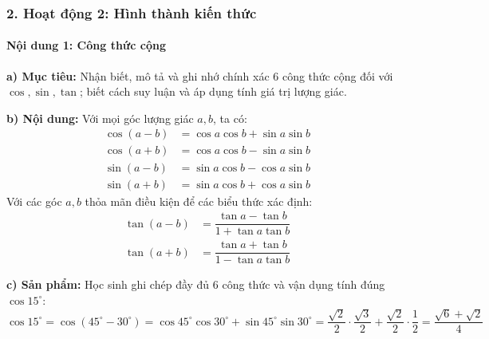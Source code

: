 \documentclass[12pt, a4paper]{article}
\begin{document}
\subsubsection*{2. Hoạt động 2: Hình thành kiến thức}

\paragraph{Nội dung 1: Công thức cộng}
\textbf{a) Mục tiêu:} Nhận biết, mô tả và ghi nhớ chính xác 6 công thức cộng đối với $\cos, \sin, \tan$; biết cách suy luận và áp dụng tính giá trị lượng giác.

\textbf{b) Nội dung:}
Với mọi góc lượng giác $a, b$, ta có:
\begin{align*}
    \cos(a - b) &= \cos a \cos b + \sin a \sin b \\
    \cos(a + b) &= \cos a \cos b - \sin a \sin b \\
    \sin(a - b) &= \sin a \cos b - \cos a \sin b \\
    \sin(a + b) &= \sin a \cos b + \cos a \sin b
\end{align*}
Với các góc $a, b$ thỏa mãn điều kiện để các biểu thức xác định:
\begin{align*}
    \tan(a - b) &= \dfrac{\tan a - \tan b}{1 + \tan a \tan b} \\
    \tan(a + b) &= \dfrac{\tan a + \tan b}{1 - \tan a \tan b}
\end{align*}

\textbf{c) Sản phẩm:} Học sinh ghi chép đầy đủ 6 công thức và vận dụng tính đúng $\cos 15^\circ$:
$$\cos 15^\circ = \cos(45^\circ - 30^\circ) = \cos 45^\circ \cos 30^\circ + \sin 45^\circ \sin 30^\circ = \dfrac{\sqrt{2}}{2} \cdot \dfrac{\sqrt{3}}{2} + \dfrac{\sqrt{2}}{2} \cdot \dfrac{1}{2} = \dfrac{\sqrt{6} + \sqrt{2}}{4}$$
\end{document}
